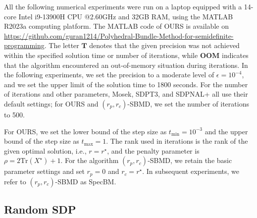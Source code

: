 \documentclass{jcmlatex}
\begin{document}
All the following numerical experiments were run on a laptop equipped with a 14-core Intel i9-13900H CPU @2.60GHz and 32GB RAM, using the MATLAB R2023a computing platform. The MATLAB code of OURS is available on \url{https://github.com/guran1214/Polyhedral-Bundle-Method-for-semidefinite-programming}. The letter \(\textbf{T}\) denotes that the given precision was not achieved within the specified solution time or number of iterations, while \(\textbf{OOM}\) indicates that the algorithm encountered an out-of-memory situation during iterations. In the following experiments, we set the precision to a moderate level of \(\epsilon=10^{-4}\), and we set the upper limit of the solution time to 1800 seconds. For the number of iterations and other parameters, Mosek, SDPT3, and SDPNAL+ all use their default settings; for OURS and \((r_p, r_c)\)-SBMD, we set the number of iterations to 500.

For OURS, we set the lower bound of the step size as \(t_{\min}=10^{-3}\) and the upper bound of the step size as \(t_{\max}=1\). The rank used in iterations is the rank of the given optimal solution, i.e., \(r=r^{\star}\), and the penalty parameter is \(\rho=2\text{Tr}(X^{\star})+1\). For the algorithm \((r_{p}, r_{c})\)-SBMD, we retain the basic parameter settings and set \(r_{p}=0\) and \(r_{c}=r^{\star}\). In subsequent experiments, we refer to \((r_p, r_c)\)-SBMD as SpecBM.


\subsection{Random SDP}
\end{document}
